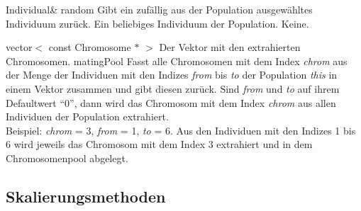 \documentclass{report}
\begin{document}
\setNormalInstance
\printEmptyMethodReturnSpecial
{Individual\&}
{random}
{Gibt ein zuf\"allig aus der Population ausgew\"ahltes Individuum zur\"uck.}
{Ein beliebiges Individuum der Population.}
{Keine.}

\vspace{4ex}

\setConstInstance
\setCorrectWidthThree{8pt}
\printMethodWithParamsSaved
{vector$<$ const Chromosome $\ast$ $>$}
{Der Vektor mit den extrahierten Chromosomen.}
{matingPool}
{Fasst alle Chromosomen mit dem Index {\em chrom} aus der Menge der 
 Individuen mit den Indizes {\em from} bis {\em to} der Population 
 {\em this} in einem Vektor zusammen und
 gibt diesen zur\"uck. Sind {\em from} und {\em to} auf ihrem Defaultwert
 ``0'', dann wird das Chromosom mit dem Index {\em chrom} aus 
 allen Individuen der Population extrahiert.\\
 Beispiel: {\em chrom} = 3, {\em from} = 1, {\em to} = 6. Aus den
 Individuen mit den Indizes 1 bis 6 wird jeweils das
 Chromosom mit dem Index 3 extrahiert und in dem
 Chromosomenpool abgelegt.}
{}
\setCorrectWidthThree{4pt}

\newpage

\subsection{Skalierungsmethoden}
\end{document}
